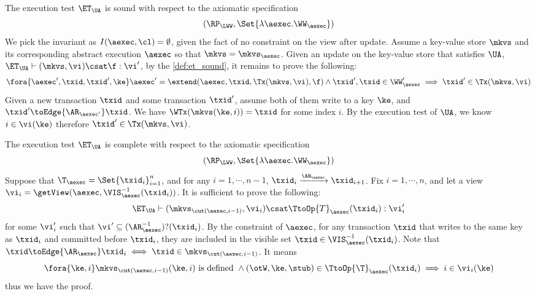 The execution test $\ET_\UA$ is sound with respect to the axiomatic specification 
\[ 
    (\RP_{\LWW}, \Set{\lambda \aexec. \WW_\aexec })
\]
We pick the invariant as \( I( \aexec, \cl ) = \emptyset \), given the fact of no constraint on the view after update.
Assume a key-value store \( \mkvs \) and its corresponding abstract execution \( \aexec \) so that \( \mkvs = \mkvs_\aexec \).
Given an update on the key-value store that satisfies \( \UA \), \ie \(\ET_\UA \vdash (\mkvs, \vi) \csat \f : \vi' \),
by the \cref{def:et_sound}, it remains to prove the following:
\[
    \begin{array}{@{}l@{}}
        \fora{ \aexec', \txid, \txid', \ke } 
        \aexec' = \extend(\aexec, \txid, \Tx(\mkvs, \vi), \f ) 
        \land \txid', \txid \in \WW_\aexec' 
        \implies \txid' \in \Tx(\mkvs, \vi)
    \end{array}
\]
Given a new transaction \( \txid \) and some transaction \( \txid' \),
assume both of them write to a key \( \ke \), and \( \txid' \toEdge{\AR_{\aexec'}} \txid \).
We have \( \WTx(\mkvs(\ke, i)) = \txid \) for some index \( i \).
By the execution test of \( \UA \), we know \( i \in \vi(\ke) \) therefore \( \txid' \in \Tx(\mkvs, \vi) \).

The execution test $\ET_\UA$ is complete with respect to the axiomatic specification 
\[ 
    (\RP_{\LWW}, \Set{\lambda \aexec. \WW_\aexec })
\]
Suppose that $\T_{\aexec} = \Set{\txid_{i}}_{i=1}^{n}$, and for any $i=1,\cdots, n-1$,
$\txid_{i} \xrightarrow{\AR_{\aexec}} \txid_{i+1}$.
Fix $i=1,\cdots,n$, and let a view $\vi_{i} = \getView(\aexec, \VIS^{-1}_{\aexec}(\txid_{i}))$.
It is sufficient to prove the following:
\[
    \ET_\UA \vdash ( \mkvs_{\cut(\aexec, i-1)}, \vi_i ) \csat \TtoOp{T}_{\aexec}(\txid_{i}) : \vi'_{i}
\]
for some \( \vi'_i \) such that \( \vi' \subseteq (\AR^{-1}_\aexec)?(\txid_i) \).
By the constraint of \( \aexec \), 
for any transaction \( \txid \) that writes to the same key as \( \txid_i \) and committed before \( \txid_i \), 
they are included in the visible set \(\txid \in \VIS^{-1}_{\aexec}(\txid_{i}) \).
Note that \( \txid \toEdge{\AR_\aexec} \txid_i \iff \txid \in \mkvs_{\cut(\aexec,i-1)}\).
It means 
\[ 
    \fora{\ke, i} \mkvs_{\cut(\aexec,i-1)}(\ke, i) \text{ is defined } \land  (\otW, \ke, \stub) \in \TtoOp{\T}_\aexec(\txid_i) \implies i \in \vi_i(\ke)
\]
thus we have the proof.

